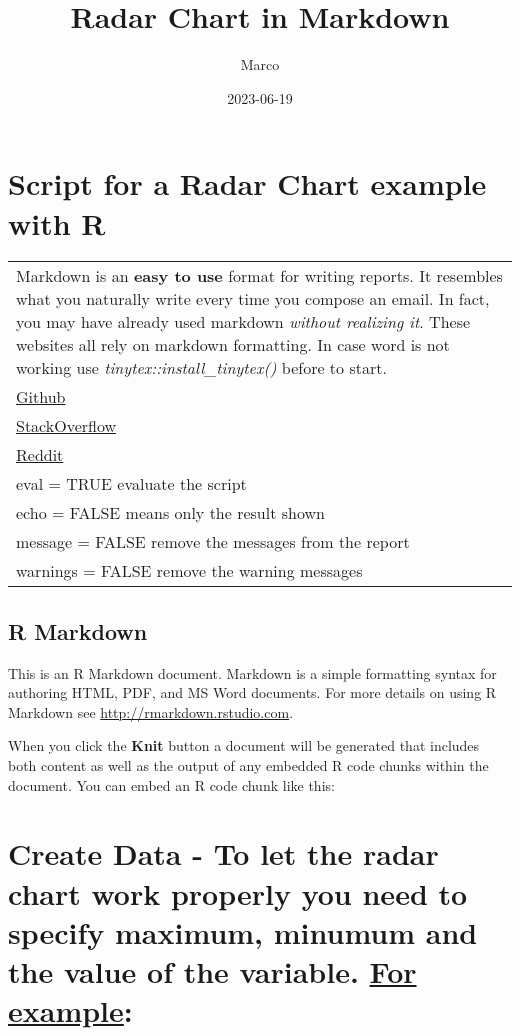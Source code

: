\documentclass[
]{article}
\title{Radar Chart in Markdown}
\author{Marco}
\date{2023-06-19}
\begin{document}
\maketitle

\hypertarget{script-for-a-radar-chart-example-with-r}{%
\section{Script for a Radar Chart example with
R}\label{script-for-a-radar-chart-example-with-r}}

\begin{longtable}[]{@{}
  >{\raggedright\arraybackslash}p{}@{}}
\toprule()
\endhead
Markdown is an \textbf{easy to use} format for writing reports. It
resembles what you naturally write every time you compose an email. In
fact, you may have already used markdown \emph{without realizing it}.
These websites all rely on markdown formatting. In case word is not
working use \emph{tinytex::install\_tinytex()} before to start. \\
* \href{www.github.com}{Github} \\
* \href{www.stackoverflow.com}{StackOverflow} \\
* \href{www.reddit.com}{Reddit} \\
eval = TRUE evaluate the script \\
echo = FALSE means only the result shown \\
message = FALSE remove the messages from the report \\
warnings = FALSE remove the warning messages \\
\bottomrule()
\end{longtable}

\hypertarget{r-markdown}{%
\subsection{R Markdown}\label{r-markdown}}

This is an R Markdown document. Markdown is a simple formatting syntax
for authoring HTML, PDF, and MS Word documents. For more details on
using R Markdown see \url{http://rmarkdown.rstudio.com}.

When you click the \textbf{Knit} button a document will be generated
that includes both content as well as the output of any embedded R code
chunks within the document. You can embed an R code chunk like this:

\hypertarget{create-data---to-let-the-radar-chart-work-properly-you-need-to-specify-maximum-minumum-and-the-value-of-the-variable.-for-example}{%
\section{\texorpdfstring{Create Data - To let the radar chart work
properly you need to specify maximum, minumum and the value of the
variable. \href{https://www.statology.org/radar-chart-in-r/}{For
example}:}{Create Data - To let the radar chart work properly you need to specify maximum, minumum and the value of the variable. For example:}}\label{create-data---to-let-the-radar-chart-work-properly-you-need-to-specify-maximum-minumum-and-the-value-of-the-variable.-for-example}}
\end{document}
